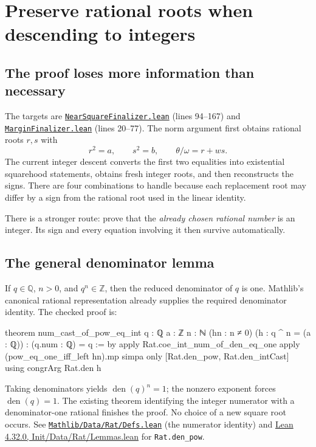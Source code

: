 \documentclass[11pt,letterpaper]{article}
\newcommand{\code}[1]{\nolinkurl{#1}}
\newcommand{\src}[2]{\href{https://github.com/VladimirReshetnikov/ProveIt/blob/e73fa2e916c9bb6f61c79e4fe2cd02b5f43e9d11/Computability/DiophantineConsistency/Lean/DiophantineConsistency/#1.lean}{\nolinkurl{#1.lean}} (lines #2)}
\newcommand{\mathsrc}[2]{\href{https://github.com/leanprover-community/mathlib4/blob/81a5d257c8e410db227a6665ed08f64fea08e997/Mathlib/#1.lean}{\nolinkurl{Mathlib/#1.lean}} (#2)}
\begin{document}
\section{Preserve rational roots when descending to integers}

\subsection{The proof loses more information than necessary}

The targets are \src{NearSquareFinalizer}{94--167} and \src{MarginFinalizer}{20--77}. The norm argument first obtains rational roots \(r,s\) with
\[
 r^2=a,\qquad s^2=b,\qquad \theta/\omega=r+w s.
\]
The current integer descent converts the first two equalities into existential squarehood statements, obtains fresh integer roots, and then reconstructs the signs. There are four combinations to handle because each replacement root may differ by a sign from the rational root used in the linear identity.

There is a stronger route: prove that the \emph{already chosen rational number} is an integer. Its sign and every equation involving it then survive automatically.

\subsection{The general denominator lemma}

If \(q\in\mathbb Q\), \(n>0\), and \(q^n\in\mathbb Z\), then the reduced denominator of \(q\) is one. Mathlib's canonical rational representation already supplies the required denominator identity. The checked proof is:

\begin{Lean}
theorem num_cast_of_pow_eq_int {q : ℚ} {a : ℤ} {n : ℕ}
    (hn : n ≠ 0) (h : q ^ n = (a : ℚ)) : (q.num : ℚ) = q := by
  apply Rat.coe_int_num_of_den_eq_one
  apply (pow_eq_one_iff_left hn).mp
  simpa only [Rat.den_pow, Rat.den_intCast] using congrArg Rat.den h
\end{Lean}

Taking denominators yields \(\operatorname{den}(q)^n=1\); the nonzero exponent forces \(\operatorname{den}(q)=1\). The existing theorem identifying the integer numerator with a denominator-one rational finishes the proof. No choice of a new square root occurs. See \mathsrc{Data/Rat/Defs}{the numerator identity} and \href{https://github.com/leanprover/lean4/blob/v4.32.0/src/Init/Data/Rat/Lemmas.lean}{Lean 4.32.0, Init/Data/Rat/Lemmas.lean} for \code{Rat.den_pow}.
\end{document}
